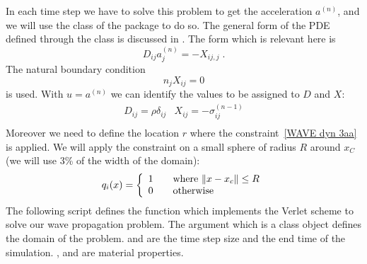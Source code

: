 In each time step we have to solve this problem to get the acceleration $a^{(n)}$,
and we will use the \LinearPDE class of the \linearPDEs package to do so.
The general form of the PDE defined through the \LinearPDE class is discussed
in . The form which is relevant here is
\begin{equation}\label{WAVE dyn 100}
D_{ij} a^{(n)}_{j} = - X_{ij,j}\; .
\end{equation}
The natural boundary condition
\begin{equation}\label{WAVE dyn 101}
n_{j}X_{ij} =0 
\end{equation}
is used. 
With $u=a^{(n)}$ we can identify the values to be assigned to $D$ and $X$:
\begin{equation}\label{WAVE dyn 6}
\begin{array}{ll}
D_{ij}=\rho \delta_{ij}&
X_{ij}=-\sigma^{(n-1)}_{ij}\\
\end{array}
\end{equation}
Moreover we need to define the location $r$ where the constraint~\ref{WAVE dyn 3aa} is applied.
We will apply the constraint on a small sphere of radius $R$ around
$x_C$ (we will use 3\% of the width of the domain):  
\begin{equation}\label{WAVE dyn 6 1}
q_{i}(x) = 
\left\{
\begin{array}{l l}
    1 & \quad \text{where $\|x-x_c\|\le R$}\\
    0 & \quad \text{otherwise}
\end{array}
\right.
\end{equation}
The following script defines the function  which
implements the Verlet scheme to solve our wave propagation problem.
The argument  which is a \Domain class object defines the domain
of the problem.
 and  are the time step size and the end time of the simulation.
,  and  are material properties.
